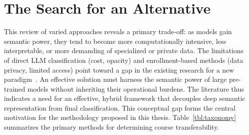 \section{The Search for an Alternative}
This review of varied approaches reveals a primary trade-off: as models gain semantic power, they tend to become more computationally intensive, less interpretable, or more demanding of specialized or private data.  The limitations of direct LLM classification (cost, opacity) and enrollment-based methods (data privacy, limited access) point toward a gap in the existing research for a new paradigm~\cite{pardos10.1145/3330430.3333622}.
An effective solution must harness the semantic power of large pre-trained models without inheriting their operational burdens.  The literature thus indicates a need for an effective, hybrid framework that decouples deep semantic representation from final classification.  This conceptual gap forms the central motivation for the methodology proposed in this thesis.  Table~\ref{tbl:taxonomy} summarizes the primary methods for determining course transferability.

